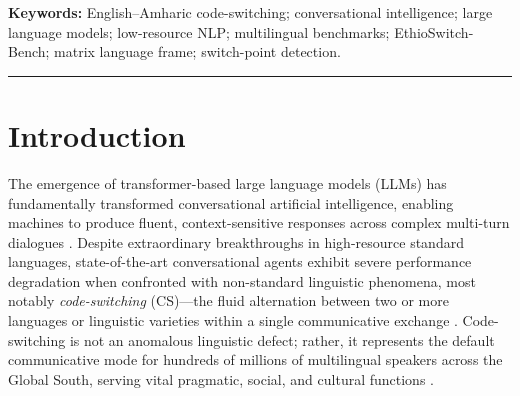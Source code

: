 \documentclass[11pt,a4paper]{article}
\begin{document}
\textbf{Keywords:} English--Amharic code-switching; conversational intelligence; large language models; low-resource NLP; multilingual benchmarks; EthioSwitch-Bench; matrix language frame; switch-point detection.

\vspace{1em}
\hrule
\vspace{1.5em}

\section{Introduction}

The emergence of transformer-based large language models (LLMs) has fundamentally transformed conversational artificial intelligence, enabling machines to produce fluent, context-sensitive responses across complex multi-turn dialogues \cite{achiam2023gpt4, touvron2023llama2, vaswani2017attention}. Despite extraordinary breakthroughs in high-resource standard languages, state-of-the-art conversational agents exhibit severe performance degradation when confronted with non-standard linguistic phenomena, most notably \textit{code-switching} (CS)---the fluid alternation between two or more languages or linguistic varieties within a single communicative exchange \cite{grosjean2010bilingual, poplack1980sometimes, sitaram2019survey}. Code-switching is not an anomalous linguistic defect; rather, it represents the default communicative mode for hundreds of millions of multilingual speakers across the Global South, serving vital pragmatic, social, and cultural functions \cite{myersscotton1993duelling, muysken2000bilingual}.
\end{document}
